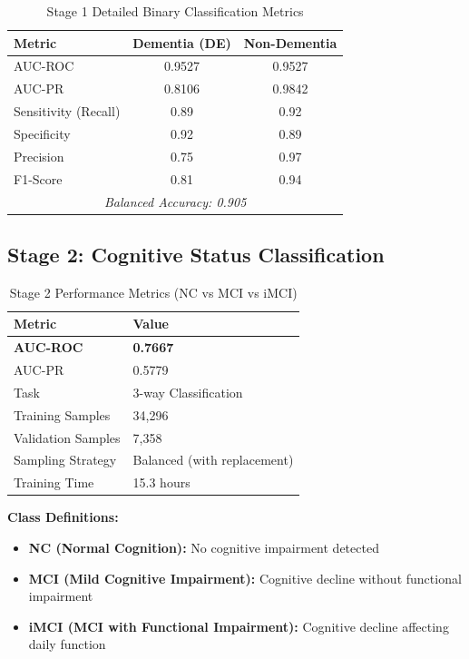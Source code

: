 \documentclass[11pt,a4paper]{article}
\begin{document}
\begin{table}[H]
\centering
\caption{Stage 1 Detailed Binary Classification Metrics}
\label{tab:stage1_detailed}
\begin{tabular}{@{}lcc@{}}
\toprule
\textbf{Metric} & \textbf{Dementia (DE)} & \textbf{Non-Dementia} \\
\midrule
AUC-ROC & 0.9527 & 0.9527 \\
AUC-PR & 0.8106 & 0.9842 \\
Sensitivity (Recall) & 0.89 & 0.92 \\
Specificity & 0.92 & 0.89 \\
Precision & 0.75 & 0.97 \\
F1-Score & 0.81 & 0.94 \\
\midrule
\multicolumn{3}{c}{\textit{Balanced Accuracy: 0.905}} \\
\bottomrule
\end{tabular}
\end{table}

\subsection{Stage 2: Cognitive Status Classification}

\begin{table}[H]
\centering
\caption{Stage 2 Performance Metrics (NC vs MCI vs iMCI)}
\label{tab:stage2}
\begin{tabular}{@{}ll@{}}
\toprule
\textbf{Metric} & \textbf{Value} \\
\midrule
\textbf{AUC-ROC} & \textbf{0.7667} \\
AUC-PR & 0.5779 \\
Task & 3-way Classification \\
Training Samples & 34,296 \\
Validation Samples & 7,358 \\
Sampling Strategy & Balanced (with replacement) \\
Training Time & 15.3 hours \\
\bottomrule
\end{tabular}
\end{table}

\textbf{Class Definitions:}
\begin{itemize}
    \item \textbf{NC (Normal Cognition):} No cognitive impairment detected
    \item \textbf{MCI (Mild Cognitive Impairment):} Cognitive decline without functional impairment
    \item \textbf{iMCI (MCI with Functional Impairment):} Cognitive decline affecting daily function
\end{itemize}
\end{document}
